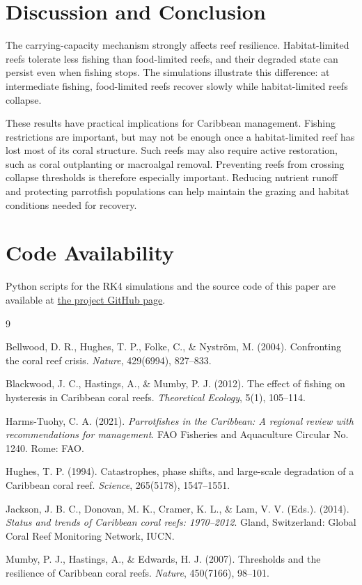 \documentclass[10pt,a4paper]{article}
\begin{document}
\section{Discussion and Conclusion}

The carrying-capacity mechanism strongly affects reef resilience. Habitat-limited reefs tolerate less fishing than food-limited reefs, and their degraded state can persist even when fishing stops. The simulations illustrate this difference: at intermediate fishing, food-limited reefs recover slowly while habitat-limited reefs collapse.

These results have practical implications for Caribbean management. Fishing restrictions are important, but may not be enough once a habitat-limited reef has lost most of its coral structure. Such reefs may also require active restoration, such as coral outplanting or macroalgal removal. Preventing reefs from crossing collapse thresholds is therefore especially important. Reducing nutrient runoff and protecting parrotfish populations can help maintain the grazing and habitat conditions needed for recovery.

\section*{Code Availability}
Python scripts for the RK4 simulations and the source code of this paper are available at \href{https://github.com/gentmaks/MA311-Final-Project}{the project GitHub page}.

\begin{thebibliography}{9}
\small

Bellwood, D. R., Hughes, T. P., Folke, C., \& Nystr{\"o}m, M. (2004).
Confronting the coral reef crisis. \textit{Nature}, 429(6994), 827--833.

Blackwood, J. C., Hastings, A., \& Mumby, P. J. (2012).
The effect of fishing on hysteresis in Caribbean coral reefs.
\textit{Theoretical Ecology}, 5(1), 105--114.

Harms-Tuohy, C. A. (2021).
\textit{Parrotfishes in the Caribbean: A regional review with recommendations for management}.
FAO Fisheries and Aquaculture Circular No. 1240. Rome: FAO.

Hughes, T. P. (1994).
Catastrophes, phase shifts, and large-scale degradation of a Caribbean coral reef.
\textit{Science}, 265(5178), 1547--1551.

Jackson, J. B. C., Donovan, M. K., Cramer, K. L., \& Lam, V. V. (Eds.). (2014).
\textit{Status and trends of Caribbean coral reefs: 1970--2012}.
Gland, Switzerland: Global Coral Reef Monitoring Network, IUCN.

Mumby, P. J., Hastings, A., \& Edwards, H. J. (2007).
Thresholds and the resilience of Caribbean coral reefs.
\textit{Nature}, 450(7166), 98--101.

\end{thebibliography}
\end{document}
